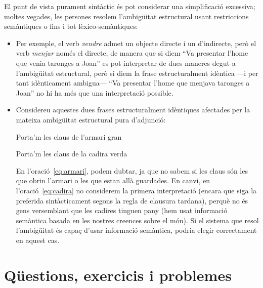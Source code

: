 El punt de vista purament sintàctic és pot considerar una
simplificació excessiva; moltes vegades, les persones resolem
l'ambigüitat estructural usant restriccions semàntiques o fins i tot
lèxico-semàntiques:
\begin{itemize}
\item Per exemple, el verb \emph{vendre} admet un objecte directe i un
  d'indirecte, però el verb \emph{menjar} només el directe, de manera
  que si diem ``Va presentar l'home que venia taronges a Joan'' es pot
  interpretar de dues maneres degut a l'ambigüitat estructural, però
  si diem la frase estructuralment idèntica ---i per tant idènticament
  ambigua--- ``Va presentar l'home que menjava taronges a Joan'' no hi
  ha més que una interpretació possible.
\item Considereu aquestes dues frases estructuralment idèntiques
  afectades per la mateixa ambigüitat estructural pura d'adjunció:
\begin{exemple}
\label{eq:armari}
Porta'm les claus de l'armari gran
\end{exemple} 
\begin{exemple}
\label{eq:cadira}
Porta'm les claus de la cadira verda
\end{exemple} 
En l'oració~\ref{eq:armari}, podem dubtar, ja que no sabem si les
claus són les que obrin l'armari o les que estan allà guardades. En
canvi, en l'oració~\ref{eq:cadira} no considerem la primera
interpretació (encara que siga la preferida sintàcticament segons la
regla de clausura tardana), perquè no és gens versemblant que les
cadires tinguen pany (hem usat informació semàntica basada en les
nostres creences sobre el món). Si el sistema que resol l'ambigüitat
és capaç d'usar informació semàntica, podria elegir correctament en
aquest cas.
\end{itemize}


\section{Qüestions, exercicis i problemes}


